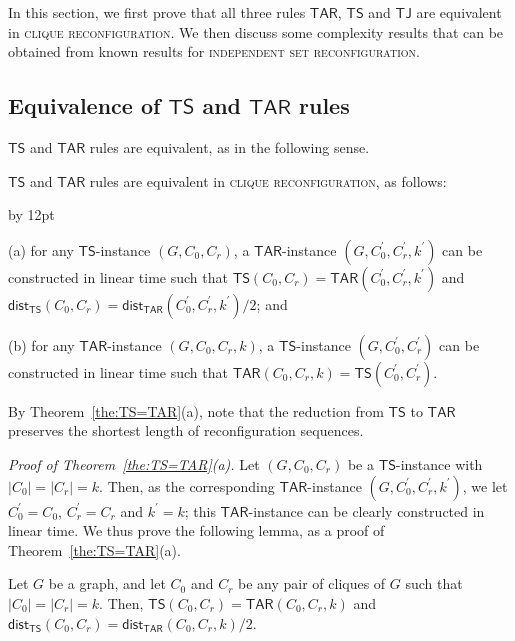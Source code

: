 \documentclass{llncs}
\newcommand{\TS}{\mathsf{TS}}
\newcommand{\TJ}{\mathsf{TJ}}
\newcommand{\ini}{0}
\newcommand{\tar}{r}
\newcommand{\cliq}{C}
\newcommand{\TARrule}{\mathsf{TAR}}
\newcommand{\TARins}[3]{\mathsf{TAR}(#1,#2,#3)}
\newcommand{\TSins}[2]{\mathsf{TS}(#1,#2)}
\newcommand{\distTAR}[3]{\mathsf{dist_{TAR}}(#1,#2,#3)}
\newcommand{\distTS}[2]{\mathsf{dist_{TS}}(#1,#2)}
\newenvironment{listing}[1]{\begin{list}{*}{\settowidth{\labelwidth}{#1}\setlength{\leftmargin}{\labelwidth}\advance \leftmargin by 12pt
\setlength{\itemsep}{0pt}\setlength{\parsep}{0pt}\setlength{\topsep}{0pt}\setlength{\parskip}{0pt}}}{\end{list}}
\newcounter{three}
\begin{document}
In this section, we first prove that all three rules $\TARrule$, $\TS$ and $\TJ$ are equivalent in \textsc{clique reconfiguration}.
We then discuss some complexity results that can be obtained from known results for \textsc{independent set reconfiguration}.
	

\subsection{Equivalence of $\TS$ and $\TARrule$ rules} 

$\TS$ and $\TARrule$ rules are equivalent, as in the following sense.
	\begin{theorem} \label{the:TS=TAR}
	$\TS$ and $\TARrule$ rules are equivalent in \textsc{clique reconfiguration}, as follows{\rm :} 
		\begin{listing}{aaa}
		\item[{\rm (}a{\rm )}] for any $\TS$-instance $(G, \cliq_{\ini}, \cliq_{\tar})$, a $\TARrule$-instance $(G, \cliq_{\ini}^\prime, \cliq_{\tar}^\prime, k^\prime)$ can be constructed in linear time such that  $\TSins{\cliq_{\ini}}{\cliq_{\tar}} = \TARins{\cliq_{\ini}^\prime}{\cliq_{\tar}^\prime}{k^\prime}$ and $\distTS{\cliq_{\ini}}{\cliq_{\tar}} = \distTAR{\cliq_{\ini}^\prime}{\cliq_{\tar}^\prime}{k^\prime} /2${\rm ;} and
		\item[{\rm (}b{\rm )}] for any $\TARrule$-instance $(G, \cliq_{\ini}, \cliq_{\tar},k)$, a $\TS$-instance $(G, \cliq_{\ini}^\prime, \cliq_{\tar}^\prime)$ can be constructed in linear time such that $\TARins{\cliq_{\ini}}{\cliq_{\tar}}{k} = \TSins{\cliq_{\ini}^\prime}{\cliq_{\tar}^\prime}$.
		\end{listing}
	\end{theorem}
	By Theorem~\ref{the:TS=TAR}(a), note that the reduction from $\TS$ to $\TARrule$ preserves the shortest length of reconfiguration sequences.
\medskip

	\noindent
	{\em Proof of Theorem~{\rm \ref{the:TS=TAR}(}a{\rm )}.}
	Let $(G, \cliq_{\ini}, \cliq_{\tar})$ be a $\TS$-instance with $|\cliq_{\ini}| = |\cliq_{\tar}| = k$.
	Then, as the corresponding $\TARrule$-instance $(G, \cliq_{\ini}^\prime, \cliq_{\tar}^\prime, k^\prime)$, we let $\cliq_{\ini}^\prime = \cliq_{\ini}$, $\cliq_{\tar}^\prime = \cliq_{\tar}$ and $k^\prime = k$;
this $\TARrule$-instance can be clearly constructed in linear time.
	We thus prove the following lemma, as a proof of Theorem~\ref{the:TS=TAR}(a).
	\begin{lemma} \label{lem:TS->TAR}
	Let $G$ be a graph, and let $\cliq_{\ini}$ and $\cliq_{\tar}$ be any pair of cliques of $G$ such that $|\cliq_{\ini}| = |\cliq_{\tar}| = k$.
	Then, $\TSins{\cliq_{\ini}}{\cliq_{\tar}} = \TARins{\cliq_{\ini}}{\cliq_{\tar}}{k}$ and $\distTS{\cliq_{\ini}}{\cliq_{\tar}} = \distTAR{\cliq_{\ini}}{\cliq_{\tar}}{k} /2$.
	\end{lemma}
\end{document}
